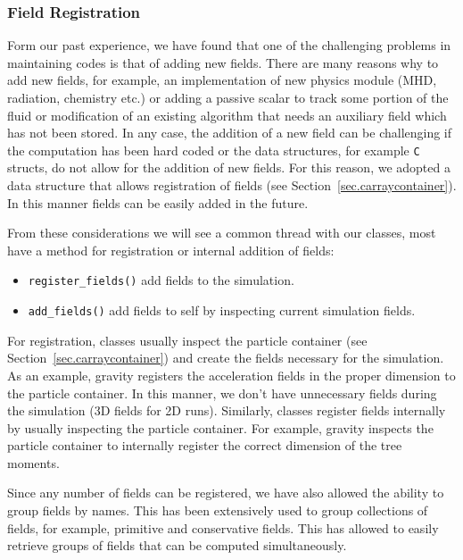 \subsubsection{Field Registration}
Form our past experience, we have found that one of the challenging problems in maintaining codes
is that of adding new fields. There are many reasons why to add new fields, for example,
an implementation of new physics module (MHD, radiation, chemistry etc.) or adding a passive scalar
to track some portion of the fluid or modification of an existing algorithm that needs an auxiliary
field which has not been stored. In any case, the addition of a new field can be challenging
if the computation has been hard coded or the data structures, for example \texttt{C} structs, do not
allow for the addition of new fields. For this reason, we adopted a data structure
that allows registration of fields (see Section~\ref{sec.carraycontainer}). In this manner
fields can be easily added in the future.

From these considerations we will see a common thread with our classes, most have a method
for registration or internal addition of fields:
\begin{itemize}
	\item \lstinline{register_fields()} add fields to the simulation.
    \item \lstinline{add_fields()} add fields to self by inspecting current simulation fields.
\end{itemize}
For registration, classes usually inspect the particle container (see Section~\ref{sec.carraycontainer})
and create the fields necessary for the simulation. As an example, gravity registers the acceleration fields
in the proper dimension to the particle container. In this manner, we don't have unnecessary fields during 
the simulation (3D fields for 2D runs). Similarly, classes register fields internally by usually
inspecting the particle container. For example, gravity inspects the particle container to internally 
register the correct dimension of the tree moments.

Since any number of fields can be registered, we have also allowed the ability to group
fields by names. This has been extensively used to group collections of fields, for example,
primitive and conservative fields. This has allowed to easily retrieve groups of fields
that can be computed simultaneously.

